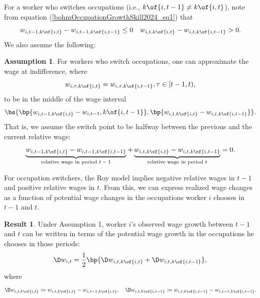 \documentclass[12pt]{article}
\newcommand{\highlightO}[1]{{\emph{\color{MyOrange}{#1}}}}
\theoremstyle{definition}
\newtheorem{assumption}{Assumption}
\newtheorem{result}{Result}
\begin{document}
For a worker who switches occupations (i.e., $k\of{i,t-1} \neq k\of{i,t}$), note from equation (\ref{bohmOccupationGrowthSkill2024_eq1}) that 
\begin{equation}
    \notag 
    w_{i, t-1, k\of{i,t}} - w_{i, t-1, k\of{i,t-1}} \leq 0 \quad w_{i,t,k\of{i,t}} - w_{i, t, k\of{i, t-1}} > 0.
\end{equation}
We also assume the following:
\begin{assumption}
For workers who switch occupations, one can approximate the wage at indifference, where 
$$w_{i, \tau, k\of{i,t}} = w_{i, \tau, k\of{i,t-1}}, \tau \in [t-1, t),$$
to be in the middle of the wage interval 
$$\bs{\bp{w_{i, t-1, k\of{i,t}} - w_{i, t-1}, k\of{i, t-1}}, \bp{w_{i, t, k\of{i,t}} - w_{i, t, k\of{i, t-1}}}}.$$
That is, we assume the switch point to be halfway between the previous and the current relative wage:
\begin{equation}
    \label{bohmOccupationGrowthSkill2024_eq2}
    \underbrace{w_{i, t-1, k\of{i,t}} - w_{i, t-1, k\of{i, t-1}}}_{\text{relative wage in period $t-1$}} + \underbrace{w_{i, t, k\of{i,t}} - w_{i, t, k\of{i, t-1}}}_{\text{relative wage in period $t$}} = 0.
\end{equation}
\end{assumption}

For occupation switchers, the Roy model implies negative relative wages in $t-1$ and positive relative wages in $t$. \highlightO{Assumption 1 posits that the absolute values of these relative wages (i.e., the wage rents from the chosen occupation or the wage distance to indifference) are the same in both periods.} From this, we can express realized wage changes as a function of potential wage changes in the occupations worker $i$ chooses in $t-1$ and $t$.

\begin{result}
Under Assumption 1, worker $i$'s observed wage growth between $t-1$ and $t$ can be written in terms of the potential wage growth in the occupations he chooses in those periods:
\begin{equation}
    \label{bohmOccupationGrowthSkill2024_eq3}
    \D w_{i,t} = \frac{1}{2} \bp{\D w_{i, t, k\of{i,t}} + \D w_{i, t, k\of{i, t-1}}},
\end{equation}
where 
$$
\D w_{i, t, k\of{i,t}} \coloneqq w_{i, t, k\of{i, t}} - w_{i, t-1, k\of{i, t}}, \quad \D w_{i, t, k\of{i, t-1}} \coloneqq w_{i, t, k\of{i,t-1}} - w_{i, t-1, k\of{i, t-1}}.
$$
\end{result}
\end{document}
